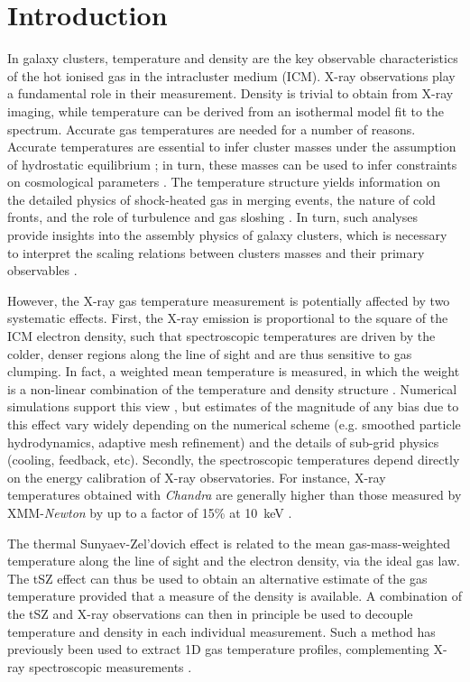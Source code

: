 \documentclass[twocolumn,traditabstract]{aa}
\begin{document}
\section{Introduction}\label{sec:Introduction}
In galaxy clusters, temperature and density are the key observable characteristics of the hot ionised gas in the intracluster medium (ICM). X-ray observations play a fundamental role in their measurement. Density is trivial to obtain from X-ray imaging, while temperature can be derived from an isothermal model fit to the spectrum. Accurate gas temperatures are needed for a number of reasons. Accurate temperatures are essential to infer cluster masses under the assumption of hydrostatic equilibrium \citep{Sarazin1988}; in turn, these masses can be used to infer constraints on cosmological parameters \citep[e.g.][]{Allen2011}. The temperature structure yields information on the detailed physics of shock-heated gas in merging events, the nature of cold fronts, and the role of turbulence and gas sloshing \citep[see e.g.][for a review]{mar07}. In turn, such analyses provide insights into the assembly physics of galaxy clusters, which is necessary to interpret the scaling relations between clusters masses and their primary observables \citep{Khedekar2013}.

However, the X-ray gas temperature measurement is potentially affected by two systematic effects. First, the X-ray emission is proportional to the square of the ICM electron density, such that spectroscopic temperatures are driven by the colder, denser regions along the line of sight and are thus sensitive to gas clumping. In fact, a weighted mean temperature is measured, in which the weight is a non-linear combination of the temperature and density structure \citep[see e.g.][]{maz04,vik06b}. Numerical simulations support this view \citep[e.g.][]{Nagai2007,ras14}, but estimates of the magnitude of any bias due to this effect vary widely depending on the numerical scheme (e.g. smoothed particle hydrodynamics, adaptive mesh refinement) and the details of sub-grid physics (cooling, feedback, etc). Secondly, the spectroscopic temperatures depend directly on the energy calibration of X-ray observatories. For instance, X-ray temperatures obtained with \textit{Chandra} are generally higher than those measured by XMM-\textit{Newton} by up to a factor of 15\% at 10~keV \citep[e.g.][]{Mahdavi2013}.

The thermal Sunyaev-Zel'dovich \citep[tSZ;][]{Sunyaev1972} effect is related to the mean gas-mass-weighted temperature along the line of sight and the electron density, via the ideal gas law. The tSZ effect can thus be used to obtain an alternative estimate of the gas temperature provided that a measure of the density is available. A combination of the tSZ and X-ray observations can then in principle be used to decouple temperature and density in each individual measurement. Such a method has previously been used to extract 1D gas temperature profiles, complementing X-ray spectroscopic measurements \citep[e.g.][]{Pointecouteau2002,Kitayama2004,Nord2009,Basu2010,Eckert2013,Ruppin2016}.
\end{document}
